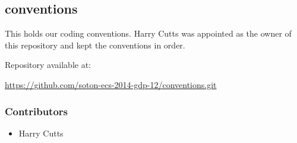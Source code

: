 \subsection{conventions}
\label{Section:Repo_conventions}

This holds our coding conventions. Harry Cutts was appointed as the owner of this repository and kept the conventions in order.

Repository available at:

\url{https://github.com/soton-ecs-2014-gdp-12/conventions.git}

\subsubsection{Contributors}
\begin{itemize}
  \item Harry Cutts
\end{itemize}
